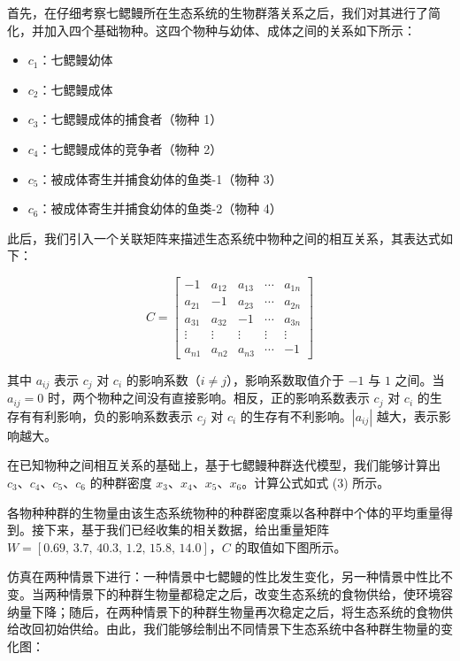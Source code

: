 \documentclass[11pt,a4paper]{ctexart}
\begin{document}
首先，在仔细考察七鳃鳗所在生态系统的生物群落关系之后，我们对其进行了简化，并加入四个基础物种。这四个物种与幼体、成体之间的关系如下所示：

\begin{itemize}
\item $c_1$：七鳃鳗幼体
\item $c_2$：七鳃鳗成体
\item $c_3$：七鳃鳗成体的捕食者（物种 1）
\item $c_4$：七鳃鳗成体的竞争者（物种 2）
\item $c_5$：被成体寄生并捕食幼体的鱼类-1（物种 3）
\item $c_6$：被成体寄生并捕食幼体的鱼类-2（物种 4）
\end{itemize}

此后，我们引入一个关联矩阵来描述生态系统中物种之间的相互关系，其表达式如下：

\begin{equation}
C=\left[
\begin{array}{ccccc}
-1 & a_{12} & a_{13} & \cdots & a_{1n}\\
a_{21} & -1 & a_{23} & \cdots & a_{2n}\\
a_{31} & a_{32} & -1 & \cdots & a_{3n}\\
\vdots & \vdots & \vdots & \vdots & \vdots\\
a_{n1} & a_{n2} & a_{n3} & \cdots & -1
\end{array}
\right]
\end{equation}

其中 $a_{ij}$ 表示 $c_j$ 对 $c_i$ 的影响系数（$i\neq j$），影响系数取值介于 $-1$ 与 $1$ 之间。当 $a_{ij}=0$ 时，两个物种之间没有直接影响。相反，正的影响系数表示 $c_j$ 对 $c_i$ 的生存有有利影响，负的影响系数表示 $c_j$ 对 $c_i$ 的生存有不利影响。$\left|a_{ij}\right|$ 越大，表示影响越大。

在已知物种之间相互关系的基础上，基于七鳃鳗种群迭代模型，我们能够计算出 $c_3$、$c_4$、$c_5$、$c_6$ 的种群密度 $x_3$、$x_4$、$x_5$、$x_6$。计算公式如式 (3) 所示。

各物种种群的生物量由该生态系统物种的种群密度乘以各种群中个体的平均重量得到。接下来，基于我们已经收集的相关数据，给出重量矩阵 $W=[0.69,\,3.7,\,40.3,\,1.2,\,15.8,\,14.0]$，$C$ 的取值如下图所示。

仿真在两种情景下进行：一种情景中七鳃鳗的性比发生变化，另一种情景中性比不变。当两种情景下的种群生物量都稳定之后，改变生态系统的食物供给，使环境容纳量下降；随后，在两种情景下的种群生物量再次稳定之后，将生态系统的食物供给改回初始供给。由此，我们能够绘制出不同情景下生态系统中各种群生物量的变化图：
\end{document}
